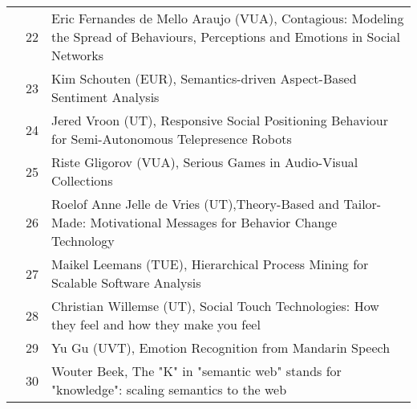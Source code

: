 \begin{longtabu}{@{}l@{ }l@{\hspace{1em}}X}
	&	 22	&	 Eric Fernandes de Mello Araujo (VUA), Contagious: Modeling the Spread of Behaviours, Perceptions and Emotions in Social Networks \\
	&	 23	&	 Kim Schouten (EUR), Semantics-driven Aspect-Based Sentiment Analysis \\
	&	 24	&	 Jered Vroon (UT), Responsive Social Positioning Behaviour for Semi-Autonomous Telepresence Robots \\
	&	 25	&	 Riste Gligorov (VUA), Serious Games in Audio-Visual Collections \\
	&	 26	& 	 Roelof Anne Jelle de Vries (UT),Theory-Based and Tailor-Made: Motivational Messages for Behavior Change Technology \\
	&	 27	&	 Maikel Leemans (TUE), Hierarchical Process Mining for Scalable Software Analysis \\
	&	 28	&	 Christian Willemse (UT), Social Touch Technologies: How they feel and how they make you feel \\
	&	 29	&	 Yu Gu (UVT), Emotion Recognition from Mandarin Speech \\
	&	 30	&	 Wouter Beek,  The "K" in "semantic web" stands for "knowledge": scaling semantics to the web \\


\end{longtabu}
